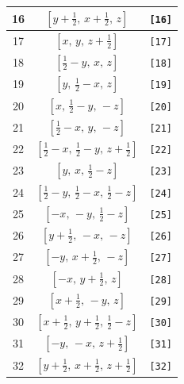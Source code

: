 \documentclass[fleqn,8pt]{jsarticle}
\begin{document}
\begin{longtable}{ccc}
16 & $\left[ y + \frac{1}{2},\, x + \frac{1}{2},\, z \right]$ & {\tt [16]} \\ \hline
17 & $\left[ x,\, y,\, z + \frac{1}{2} \right]$ & {\tt [17]} \\ \hline
18 & $\left[ \frac{1}{2} - y,\, x,\, z \right]$ & {\tt [18]} \\ \hline
19 & $\left[ y,\, \frac{1}{2} - x,\, z \right]$ & {\tt [19]} \\ \hline
20 & $\left[ x,\, \frac{1}{2} - y,\, - z \right]$ & {\tt [20]} \\ \hline
21 & $\left[ \frac{1}{2} - x,\, y,\, - z \right]$ & {\tt [21]} \\ \hline
22 & $\left[ \frac{1}{2} - x,\, \frac{1}{2} - y,\, z + \frac{1}{2} \right]$ & {\tt [22]} \\ \hline
23 & $\left[ y,\, x,\, \frac{1}{2} - z \right]$ & {\tt [23]} \\ \hline
24 & $\left[ \frac{1}{2} - y,\, \frac{1}{2} - x,\, \frac{1}{2} - z \right]$ & {\tt [24]} \\ \hline
25 & $\left[ - x,\, - y,\, \frac{1}{2} - z \right]$ & {\tt [25]} \\ \hline
26 & $\left[ y + \frac{1}{2},\, - x,\, - z \right]$ & {\tt [26]} \\ \hline
27 & $\left[ - y,\, x + \frac{1}{2},\, - z \right]$ & {\tt [27]} \\ \hline
28 & $\left[ - x,\, y + \frac{1}{2},\, z \right]$ & {\tt [28]} \\ \hline
29 & $\left[ x + \frac{1}{2},\, - y,\, z \right]$ & {\tt [29]} \\ \hline
30 & $\left[ x + \frac{1}{2},\, y + \frac{1}{2},\, \frac{1}{2} - z \right]$ & {\tt [30]} \\ \hline
31 & $\left[ - y,\, - x,\, z + \frac{1}{2} \right]$ & {\tt [31]} \\ \hline
32 & $\left[ y + \frac{1}{2},\, x + \frac{1}{2},\, z + \frac{1}{2} \right]$ & {\tt [32]} \\
\end{longtable}
\end{document}
